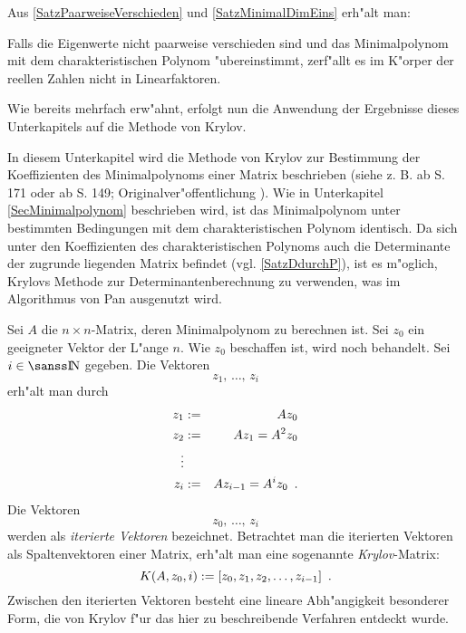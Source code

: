Aus \ref{SatzPaarweiseVerschieden} und \ref{SatzMinimalDimEins} erh"alt
man:
\begin{korollar}
\label{SatzMinimalKomplex}
    Falls die Eigenwerte nicht paarweise verschieden sind und das
    Minimalpolynom mit dem charakteristischen Polynom "ubereinstimmt,
    zerf"allt es im K"orper der reellen Zahlen nicht in Linearfaktoren.
\end{korollar}

Wie bereits mehrfach erw"ahnt, erfolgt nun die Anwendung der Ergebnisse 
dieses Unterkapitels auf die Methode von Krylov.



\label{SecKrylov}

In diesem Unterkapitel wird die Methode von Krylov zur Bestimmung der
Koeffizienten des Minimalpolynoms einer Matrix beschrieben
(siehe z. B. \cite{Zurm64} ab S. 171 oder \cite{Hous64} ab S. 149;
Originalver"offentlichung \cite{Kryl31} ). Wie in Unterkapitel 
\ref{SecMinimalpolynom} beschrieben wird, ist das Minimalpolynom
unter bestimmten Bedingungen mit dem charakteristischen Polynom identisch.
Da sich unter den Koeffizienten des charakteristischen Polynoms auch die
Determinante der zugrunde liegenden Matrix befindet 
(vgl. \ref{SatzDdurchP}), ist es m"oglich, Krylovs Methode zur 
Determinantenberechnung zu verwenden, was im Algorithmus von Pan 
ausgenutzt wird.

Sei $A$ die $n \times n$-Matrix, deren Minimalpolynom zu
berechnen ist. 
Sei $z_0$ ein geeigneter Vektor der L"ange $n$. Wie $z_0$ beschaffen ist, 
wird noch behandelt. Sei $i \in \Nat$ gegeben. Die 
Vektoren \[ z_1,\, \ldots,\, z_i \] erh"alt man durch
\begin{eqnarray}
    z_1 & := & A z_0 \nonumber \\
    z_2 & := & A z_1 = A^2 z_0 \nonumber \\
    \vdots \nonumber \\
    z_i & := & A z_{i-1} = A^i z_0 \label{EquDefZI} \mbox{\hspace{0.5em}.}
\end{eqnarray}
Die Vektoren \[ z_0,\, \ldots ,\, z_i \] werden als {\em iterierte Vektoren}
bezeichnet.
Betrachtet man die iterierten Vektoren als Spaltenvektoren einer Matrix,
erh"alt man eine sogenannte {\em Krylov}-Matrix:
\[ K(A,z_0,i):= [ z_0, z_1, z_2, \ldots, z_{i-1} ] \mbox{\hspace{0.5em}.} \]
Zwischen den iterierten Vektoren besteht eine lineare Abh"angigkeit
besonderer Form, die von Krylov \cite{Kryl31} f"ur das hier zu
beschreibende Verfahren entdeckt wurde.

